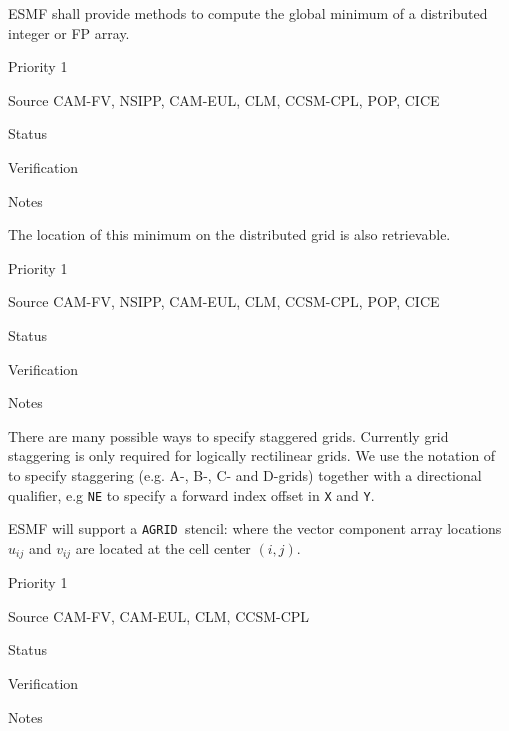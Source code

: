 
ESMF shall provide methods to compute the global minimum of a
distributed integer or FP array.

\begin{reqlist}
\item[Priority] 1
\item[Source] CAM-FV, NSIPP, CAM-EUL, CLM, CCSM-CPL, POP, CICE
\item[Status]
\item[Verification]
\item[Notes]
\end{reqlist}



The location of this minimum on the distributed grid is also
retrievable.

\begin{reqlist}
\item[Priority] 1
\item[Source] CAM-FV, NSIPP, CAM-EUL, CLM, CCSM-CPL, POP, CICE
\item[Status]
\item[Verification]
\item[Notes]
\end{reqlist}



There are many possible ways to specify staggered grids.  Currently
grid staggering is only required for logically rectilinear grids. We
use the notation of \cite{ref:a1966} to specify staggering (e.g. A-,
B-, C- and D-grids) together with a directional qualifier, e.g
\texttt{NE} to specify a forward index offset in \texttt{X} and
\texttt{Y}.

\newcommand{\agrid}{\texttt{AGRID~}}
\newcommand{\bgrid}{\texttt{BGRID~}}
\newcommand{\cgrid}{\texttt{CGRID~}}
\newcommand{\dgrid}{\texttt{DGRID~}}

\sreq{\agrid}

ESMF will support a \agrid stencil: where the vector
component array locations $u_{ij}$ and $v_{ij}$ are located at the
cell center $(i,j)$.

\begin{reqlist}
\item[Priority] 1
\item[Source] CAM-FV, CAM-EUL, CLM, CCSM-CPL
\item[Status]
\item[Verification]
\item[Notes]
\end{reqlist}

